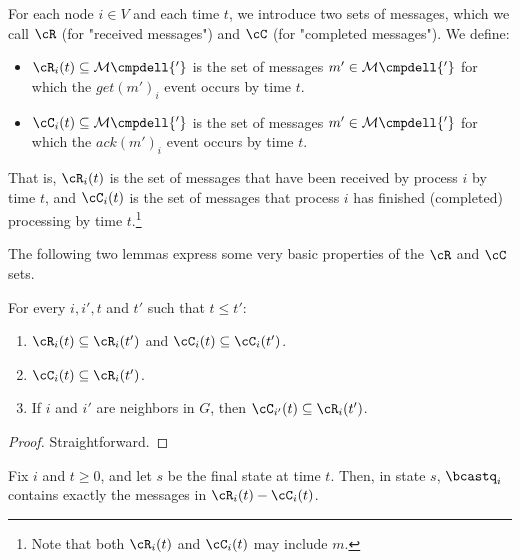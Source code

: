 For each node $i\in V$ and each time $t$, we introduce two sets of messages,
which we call $\cR$ (for "received messages") and $\cC$ (for "completed messages").
We define:
\begin{itemize}
\item
$\cR_i(t) \subseteq \mathcal{M}\cmpdell{'}$ is the set of messages $m' \in
\mathcal{M}\cmpdell{'}$ for which the  $get(m')_i$ event occurs by time $t$.
\item
$\cC_i(t)\subseteq\mathcal{M}\cmpdell{'}$ is the set of messages
$m'\in\mathcal{M}\cmpdell{'}$ for which the $ack(m')_i$ event occurs by time
$t$.
\end{itemize}
That is, $\cR_i(t)$ is the set of messages that have been received by
process $i$ by time $t$, and $\cC_i(t)$ is the set of messages that
process $i$ has finished (completed) processing by time $t$.\footnote{
Note that both $\cR_i(t)$ and $\cC_i(t)$ may include $m$.}



The following two lemmas express some very basic properties of the $\cR$ and $\cC$ sets.


\begin{lemma}

For every $i,i',t$ and $t'$ such that $t\leq t'$:
  \begin{enumerate}
  \item $\cR_i(t)\subseteq \cR_i(t')$ and $\cC_i(t)\subseteq \cC_i(t')$.
  \label{item:lemma: t<t' => C(t) <= C(t')}

  \item $\cC_{i}(t) \subseteq \cR_{i}(t')$.
  \label{item:lemma: C_i(t) subseteq R_i(t)}

  \item If $i$ and $i'$ are neighbors in $G$, then $\cC_{i'}(t) \subseteq \cR_{i}(t')$.
  \label{item:lemma: i and j neigh t'<=t C_i(t') subseteq R_j(t)}

  \end{enumerate}
\label{lemma:bmmb: C(t') subset C(t'')}
\label{lemma: CG1}
\label{lemma: CG4}
\end{lemma}
\begin{proof}
Straightforward.
\end{proof}



\begin{lemma}
\label{lemma: CG6}
Fix $i$ and $t \geq 0$, and let $s$ be the final state at time $t$.
Then, in state $s$, $\bcastq_i$ contains exactly the messages in $\cR_i(t) - \cC_i(t)$.
\end{lemma}

